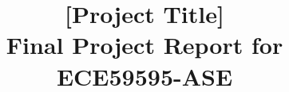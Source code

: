 
% 

% 

% 

% 

% 


% 
% 

% 

\documentclass[conference]{IEEEtran}
\IEEEoverridecommandlockouts

\usepackage{cite}
\usepackage[T1]{fontenc}
\usepackage[utf8]{inputenc}
\usepackage{amsmath,amssymb,amsfonts}
\usepackage{algorithmic}
\usepackage{graphicx}
\usepackage{textcomp}
\usepackage{url}
\usepackage{tcolorbox}
\usepackage{xcolor}
\usepackage{paralist}
\usepackage{natbib}
\usepackage{minted}               %

\def\BibTeX{{\rm B\kern-.05em{\sc i\kern-.025em b}\kern-.08em
    T\kern-.1667em\lower.7ex\hbox{E}\kern-.125emX}}

\title{[Project Title]\\Final Project Report for ECE59595-ASE}
\author{
}



